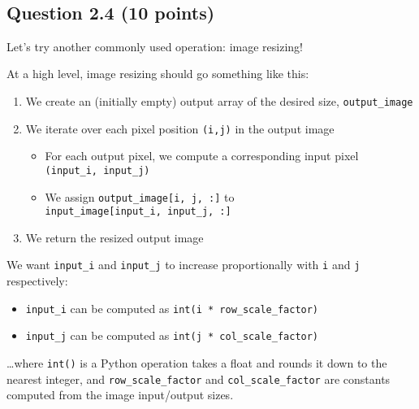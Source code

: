\documentclass[11pt]{article}
\providecommand{\tightlist}{%
      \setlength{\itemsep}{0pt}\setlength{\parskip}{0pt}}
\begin{document}
    \begin{center}
    \end{center}
    { \hspace*{\fill} \\}
    
    \hypertarget{question-2.4-10-points}{%
\subsection{Question 2.4 (10 points)}\label{question-2.4-10-points}}

Let's try another commonly used operation: image resizing!

At a high level, image resizing should go something like this:

\begin{enumerate}
\def\labelenumi{\arabic{enumi}.}
\tightlist
\item
  We create an (initially empty) output array of the desired size,
  \texttt{output\_image}
\item
  We iterate over each pixel position \texttt{(i,j)} in the output image

  \begin{itemize}
  \tightlist
  \item
    For each output pixel, we compute a corresponding input pixel
    \texttt{(input\_i,\ input\_j)}
  \item
    We assign \texttt{output\_image{[}i,\ j,\ :{]}} to
    \texttt{input\_image{[}input\_i,\ input\_j,\ :{]}}
  \end{itemize}
\item
  We return the resized output image
\end{enumerate}

We want \texttt{input\_i} and \texttt{input\_j} to increase
proportionally with \texttt{i} and \texttt{j} respectively:

\begin{itemize}
\tightlist
\item
  \texttt{input\_i} can be computed as
  \texttt{int(i\ *\ row\_scale\_factor)}
\item
  \texttt{input\_j} can be computed as
  \texttt{int(j\ *\ col\_scale\_factor)}
\end{itemize}

\ldots where \texttt{int()} is a Python operation takes a float and
rounds it down to the nearest integer, and \texttt{row\_scale\_factor}
and \texttt{col\_scale\_factor} are constants computed from the image
input/output sizes.
\end{document}

